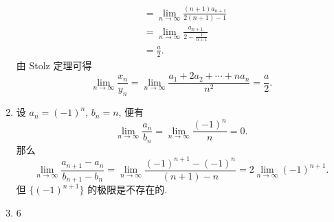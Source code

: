 \begin{enumerate}
\begin{align*}
                                                                 &= \lim_{n\to\infty}\frac{(n+1)a_{n+1}}{2(n+1) - 1} \\
                                                                 &= \lim_{n\to\infty}\frac{a_{n+1}}{2 - \frac{1}{n+1}} \\
                                                                 &= \frac a2.
        \end{align*}
        由 Stolz 定理可得
        \[
            \lim_{n\to\infty}\frac{x_n}{y_n} = \lim_{n\to\infty}\frac{a_1 + 2a_2 + \cdots + na_n}{n^2} = \frac a2.    
        \]
    \item %
        设 $a_n = (-1)^{n}$, $b_n = n$, 便有
        \[
            \lim_{n\to\infty}\frac{a_n}{b_n} = \lim_{n\to\infty}\frac{(-1)^n}{n} = 0.    
        \]
        那么
        \[
            \lim_{n\to\infty}\frac{a_{n+1} - a_n}{b_{n+1} - b_n} = \lim_{n\to\infty}\frac{(-1)^{n+1} - (-1)^n}{(n+1) - n} = 2\lim_{n\to\infty}(-1)^{n+1}.    
        \]
        但 $\{(-1)^{n+1}\}$ 的极限是不存在的. 
    \item 6
\end{enumerate}

% 
